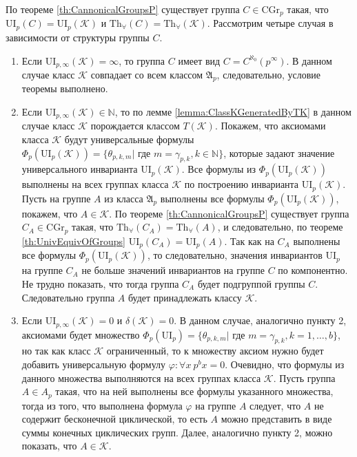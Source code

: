 \documentclass[a4paper,11pt,twoside]{article}
\def\proof{{\noindent{\bf Доказательство.}} }
\def\A{{\mathfrak{A}}}
\def\K{{\mathcal{K}}}
\def\N{{\mathbb{N}}}
\def\Tha{{\mathrm{Th}_\forall}}
\def\CG{{\mathrm{CGr}}}
\def\ui{{\mathrm{UI}}}
\begin{document}
\proof По теореме \ref{th:CannonicalGroupsP} существует группа $C \in \CG_p$ такая, что $\ui_p(C) = \ui_p(\K)$ и $\Tha(C) = \Tha(\K)$. Рассмотрим четыре случая в зависимости от структуры группы $C$.
\begin{enumerate}
\item Если $\ui_{p,\infty}(\K) = \infty$, то группа $C$ имеет вид $C = C^{\aleph_0}(p^\infty)$. В данном случае класс $\K$ совпадает со всем классом $\A_p$, следовательно, условие теоремы выполнено.

\item Если $\ui_{p, \infty}(\K) \in \N$, то по лемме \ref{lemma:ClassKGeneratedByTK} в данном случае класс $\K$ порождается классом $T(\K)$. Покажем, что аксиомами класса $\K$ будут универсальные формулы $\Phi_p(\ui_p(\K)) = \{\theta_{p,k,m} | \text{ где } m = \gamma_{p,k}, k \in \N\}$, которые задают значение универсального инварианта $\ui_p(\K).$ Все формулы из $\Phi_p(\ui_p(\K))$ выполнены на всех группах класса $\K$ по построению инварианта $\ui_p(\K)$. Пусть на группе $A$ из класса $\A_p$ выполнены все формулы $\Phi_p(\ui_p(\K))$, покажем, что $A \in \K$. По теореме \ref{th:CannonicalGroupsP} существует группа $C_A \in \CG_p$ такая, что $\Tha(C_A) = \Tha(A)$, и следовательно, по теореме \ref{th:UnivEquivOfGroups} $\ui_p(C_A) = \ui_p(A).$ Так как на $C_A$ выполнены все формулы $\Phi_p(\ui_p(\K))$, то следовательно, значения инвариантов $\ui_p$ на группе $C_A$ не больше значений инвариантов на группе $C$ по компонентно. Не трудно показать, что тогда группа $C_A$ будет подгруппой группы $C$. Следовательно группа $A$ будет принадлежать классу $\K$.

\item Если $\ui_{p, \infty}(\K) = 0$ и $\delta(\K) = 0$. В данном случае, аналогично пункту 2, аксиомами будет множество $\Phi_p(\ui_p) = \{\theta_{p,k,m} | \text{ где } m = \gamma_{p,k}, k = 1,\ldots,b\}$, но так как класс $\K$ ограниченный, то к множеству аксиом нужно будет добавить универсальную формулу $\varphi: \forall x \ p^b x = 0$. Очевидно, что формулы из данного множества выполняются на всех группах класса $\K$. Пусть группа $A \in A_p$ такая, что на ней выполнены все формулы указанного множества, тогда из того, что выполнена формула $\varphi$ на группе $A$ следует, что $A$ не содержит бесконечной циклической, то есть $A$ можно представить в виде суммы конечных циклических групп. Далее, аналогично пункту 2, можно показать, что $A \in \K$.


\end{enumerate}
\end{document}
